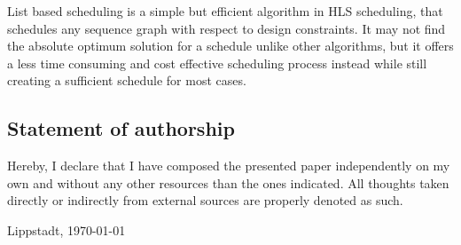 \documentclass[conference]{IEEEtran}
\begin{document}
List based scheduling is a simple but efficient algorithm in HLS scheduling, that schedules any sequence graph with respect to design constraints. It may not find the absolute optimum solution for a schedule unlike other algorithms, but it offers a less time consuming and cost effective scheduling process instead while still creating a sufficient schedule for most cases.




\subsection*{Statement of authorship}
Hereby, I declare that I have composed the presented paper independently on my own and without any other resources than the ones indicated. All thoughts taken directly or indirectly from external sources are properly denoted as such.

  \vspace{3\baselineskip}
  
  Lippstadt, \today \hspace{0.25\linewidth}\parbox{0.3\linewidth}{\dotfill}
\end{document}
